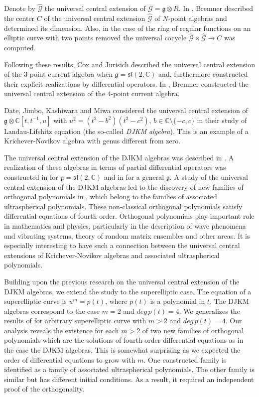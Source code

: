 \documentclass[review,nopreprintline]{elsarticle}
\theoremstyle{definition}
\numberwithin{equation}{section}
\theoremstyle{remark}
\newcommand{\fg}{\mathfrak{g}}
\newcommand{\ot}{\otimes}
\newcommand{\Cx}{\mathbb{C}}
\newcommand{\Gl}{{\mathcal{G}}}
\begin{document}
	   Denote by $\hat{\Gl}$
	   the universal central extension of $\Gl=\fg\ot R$. In \cite{bremner1994universal}, Bremner described the center $C$ of the universal central extension $\hat{\mathcal{G}}$ of $N$-point algebras and  determined its dimension. Also, in the case of the ring of regular functions on an  elliptic curve with two points removed  the universal cocycle $\hat{\mathcal{G}}\times \hat{\mathcal{G}}\to C$ was computed.
	    
	    Following these results,   Cox and Jurisich \cite{Cox2014Realizations}  described the universal central extension of the $3$-point current algebra when $\fg=\mathfrak{sl}(2,\Cx)$ and, furthermore constructed their explicit realizations by differential operators. In \cite{bremner1995four}, Bremner constructed the universal central extension of the $4$-point current algebra. 
	
	    Date, Jimbo, Kashiwara and Miwa considered the universal central extension of $\fg\ot \Cx[t,t^{-1},u]$ with $u^2=(t^2-b^2)(t^2-c^2)$, $b\in\Cx\setminus\{-c,c\}$ in their study of Landau-Lifshitz equation \cite{Date1983} (the so-called  \emph{DJKM algebra}). This is an example of a Krichever-Novikov algebra with genus different from zero. 
	   
	    The universal central extension of the DJKM algebras  was described  in \cite{Cox2011DJKMExtension}. A realization of these algebras in terms  of partial differential operators was constructed in \cite{Cox2014Realizations} for $\fg=\mathfrak{sl}(2,\Cx)$ and in \cite{Cox2014} for a general $\fg$.  A study of the universal central extension of the DJKM algebras led  to the discovery of new families of orthogonal polynomials  in \cite{Cox2013DJKMPolynomials}, which belong to the families of associated ultraspherical polynomials. These non-classical orthogonal polynomials satisfy differential equations of fourth order. Orthogonal polynomials play important role in mathematics and physics, particularly in the description of wave phenomena and vibrating systems, theory of random matrix ensembles and other areas. It is especially interesting to have such a connection  between the universal central extensions of Krichever-Novikov algebras and associated ultraspherical polynomials.
	
	    Building upon the previous research on the universal central extension of the DJKM algebras, we extend the study to the superelliptic case. The equation of a superelliptic curve is $u^m=p(t)$, where $p(t)$ is a polynomial in $t$. The DJKM algebras correspond to the case $m=2$ and $deg \, p(t)=4$. We generalizes the results of \cite{Cox2013DJKMPolynomials} for arbitrary superelliptic curve with $m>2$ and $deg \, p(t)=4$. 
	    Our analysis reveals the existence for each $m>2$ of two new families of orthogonal polynomials which are the solutions of fourth-order differential equations as in the case the DJKM algebras. This is somewhat surprising as we expected the order of differential equations to grow with $m$. 
	   One constructed family is identified as a family of associated ultraspherical polynomials. The other family is similar but has different initial conditions. As a result, it required an independent proof of the orthogonality. 
	    
\end{document}
